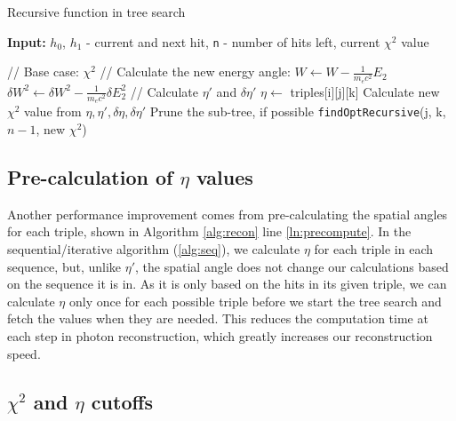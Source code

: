 \begin{algorithm}
\caption{Recursive function in tree search}\label{alg:recurse}
\hspace{\algorithmicindent} \textbf{Input:} $h_0$, $h_1$ - current and next hit, \texttt{n} - number of hits left, current $\chi^2$ value
\begin{algorithmic}[1]
    \State // Base case:
     \label{ln:hitsUsed}
        \State \Return $\chi^2$
    \EndIf
    \State
        \State // Calculate the new energy angle:
        \State $W \gets W - \frac{1}{m_e c^2}E_2$ 
        \State $\delta W^2 \gets \delta W^2 - \frac{1}{m_e c^2}\delta E_2^2$
        \State
        \State // Calculate $\eta'$ and $\delta \eta'$ 
        \State $\eta \gets$ triples[i][j][k] 
        \State
        \State Calculate new $\chi^2$ value from $\eta, \eta', \delta\eta, \delta\eta'$  \label{ln:chi2}
        \State
        \State Prune the sub-tree, if possible 
        \State
        \State \texttt{findOptRecursive}(j, k, $n-1$, new $\chi^2$) 
    \EndFor
\EndFunction
\end{algorithmic}
\end{algorithm}

\subsection{Pre-calculation of $\eta$ values}
Another performance improvement comes from pre-calculating the spatial angles for each triple, shown in Algorithm \ref{alg:recon} line \ref{ln:precompute}. In the sequential/iterative algorithm (\ref{alg:seq}), we calculate $\eta$ for each triple in each sequence, but, unlike $\eta'$, the spatial angle does not change our calculations based on the sequence it is in. As it is only based on the hits in its given triple, we can calculate $\eta$ only once for each possible triple before we start the tree search and fetch the values when they are needed. This reduces the computation time at each step in photon reconstruction, which greatly increases our reconstruction speed.

\subsection{$\chi^2$ and $\eta$ cutoffs} \label{pruning}

